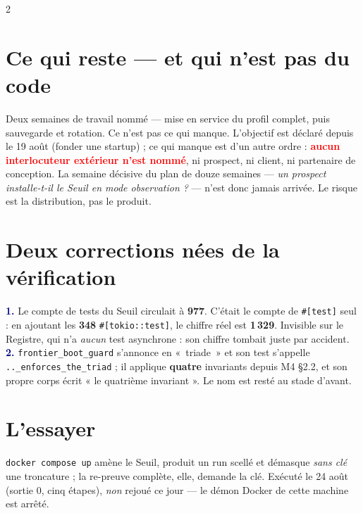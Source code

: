 \documentclass[9pt]{extarticle}
\newcommand{\code}[1]{\texttt{\footnotesize #1}}
\newcommand{\mm}[1]{\textbf{\textcolor{navy}{#1}}}
\newcommand{\ko}[1]{\textcolor{red}{\textbf{#1}}}
\begin{document}
\begin{multicols}{2}
\section{Ce qui reste — et qui n'est pas du code}
Deux semaines de travail nommé — mise en service du profil complet, puis sauvegarde et rotation. Ce n'est pas ce qui manque. L'objectif est déclaré depuis le 19 août (fonder une startup) ; ce qui manque est d'un autre ordre : \ko{aucun interlocuteur extérieur n'est nommé}, ni prospect, ni client, ni partenaire de conception. La semaine décisive du plan de douze semaines — \emph{un prospect installe-t-il le Seuil en mode observation ?} — n'est donc jamais arrivée. Le risque est la distribution, pas le produit.

\section{Deux corrections nées de la vérification}
\mm{1.} Le compte de tests du Seuil circulait à \textbf{977}. C'était le compte de \code{\#[test]} seul : en ajoutant les \textbf{348} \code{\#[tokio::test]}, le chiffre réel est \textbf{1\,329}. Invisible sur le Registre, qui n'a \emph{aucun} test asynchrone : son chiffre tombait juste par accident. \mm{2.} \code{frontier\_boot\_guard} s'annonce en «~triade~» et son test s'appelle \code{..\_enforces\_the\_triad} ; il applique \textbf{quatre} invariants depuis M4 §2.2, et son propre corps écrit « le quatrième invariant ». Le nom est resté au stade d'avant.


\section{L'essayer}
\code{docker compose up} amène le Seuil, produit un run scellé et démasque \emph{sans clé} une troncature ; la re-preuve complète, elle, demande la clé. Exécuté le 24 août (sortie 0, cinq étapes), \emph{non} rejoué ce jour — le démon Docker de cette machine est arrêté.

\end{multicols}
\end{document}
